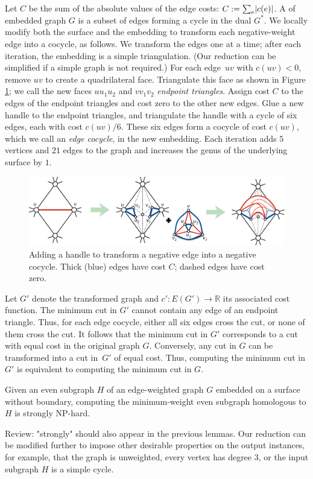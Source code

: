 \documentclass[letterpaper,review]{siamart190516}
\def\Real{\mathbb{R}}
\def\rnote#1{\color{red}Review: #1 \color{black}}
\begin{document}
{Let $C$ be the sum of the absolute values of the edge costs: $C:= \sum_e \mathopen| c(e) \mathclose|$.
A  of embedded graph $G$ is a subset of edges forming a cycle in the dual $G^*$.
We locally modify both the surface and the embedding to transform each negative-weight edge into a cocycle, as follows.  We transform the edges one at a time; after each iteration, the embedding is a simple triangulation.  (Our reduction can be simplified if a simple graph is not required.)  For each edge~$uv$ with $c(uv)<0$, remove $uv$ to create a quadrilateral face.  Triangulate this face as shown in Figure \ref{fig:addhandle}; we call the new faces $uu_1u_2$ and $vv_1v_2$ \emph{endpoint triangles}.  Assign cost $C$ to the edges of the endpoint triangles and cost zero to the other new edges. Glue a new handle to the endpoint triangles, and triangulate the handle with a cycle of six edges, each with cost $c(uv)/6$.  These six edges form a cocycle of cost $c(uv)$, which we call an \emph{edge cocycle}, in the new embedding.  Each iteration adds $5$ vertices and $21$ edges to the graph and increases the genus of the underlying surface by $1$.

\begin{figure}[hbt]
\centering\includegraphics[scale=0.4]{Fig/addhandle3}
\caption{Adding a handle to transform a negative edge into a negative cocycle.  Thick (blue) edges have cost $C$; dashed edges have cost zero.}
\label{fig:addhandle}
\end{figure}

Let $G'$ denote the transformed graph and $c'\colon E(G')\to \Real$ its associated cost function.  The minimum cut in $G'$ cannot contain any edge of an endpoint triangle.  Thus, for each edge cocycle, either all six edges cross the cut, or none of them cross the cut.  It follows that the minimum cut in $G'$ corresponds to a cut with equal cost in the original graph $G$.  Conversely, any cut in $G$ can be transformed into a cut in~$G'$ of equal cost.  Thus, computing the minimum cut in $G'$ is equivalent to computing the minimum cut in $G$.

\begin{theorem}
Given an even subgraph $H$ of an edge-weighted graph $G$ embedded on a surface without boundary, computing the minimum-weight even subgraph homologous to $H$ is strongly {NP}-hard.
\end{theorem}
\rnote{ "strongly" should also appear in the previous lemmas. }
Our reduction can be modified further to impose other desirable properties on the output instances, for example, that the graph is unweighted, every vertex has degree $3$, or the input subgraph $H$ is a simple cycle.

}
\end{document}
